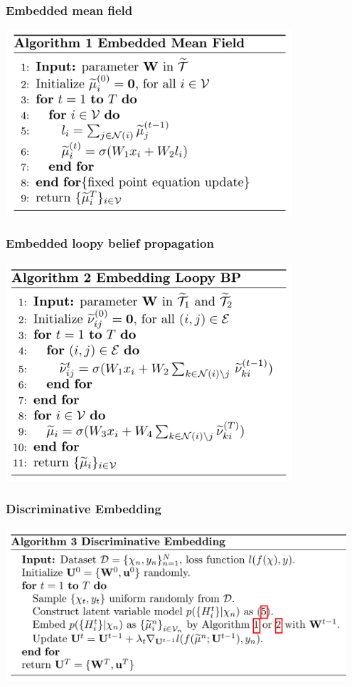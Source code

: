 \documentclass{beamer}
\begin{document}
    \begin{frame}
        \frametitle{Embedded mean field}
        \begin{center}
            \includegraphics[width=0.8\textwidth]{emf.png}
        \end{center}
    \end{frame}

    \begin{frame}
        \frametitle{Embedded loopy belief propagation}
        \begin{center}
            \includegraphics[width=0.8\textwidth]{elbp.png}
        \end{center}
    \end{frame}

    \begin{frame}
        \frametitle{Discriminative Embedding}
        \begin{center}
            \includegraphics[width=0.95\textwidth]{disc_embedding.png}
        \end{center}
    \end{frame}
\end{document}
